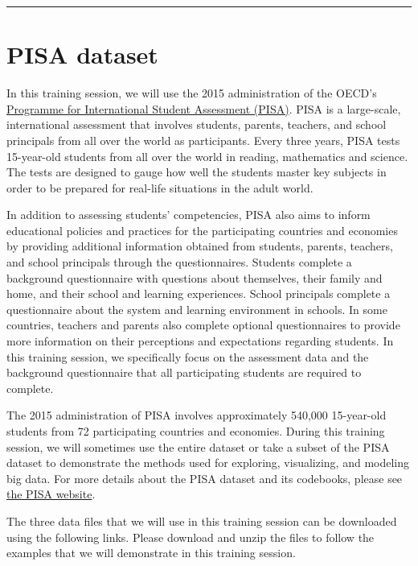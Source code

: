 \documentclass[
]{book}
\begin{document}
\begin{center}\rule{0.5\linewidth}{0.5pt}\end{center}

\hypertarget{pisa-dataset}{%
\section{PISA dataset}\label{pisa-dataset}}

In this training session, we will use the 2015 administration of the OECD's \href{http://www.oecd.org/pisa/}{Programme for International Student Assessment (PISA)}. PISA is a large-scale, international assessment that involves students, parents, teachers, and school principals from all over the world as participants. Every three years, PISA tests 15-year-old students from all over the world in reading, mathematics and science. The tests are designed to gauge how well the students master key subjects in order to be prepared for real-life situations in the adult world.

In addition to assessing students' competencies, PISA also aims to inform educational policies and practices for the participating countries and economies by providing additional information obtained from students, parents, teachers, and school principals through the questionnaires. Students complete a background questionnaire with questions about themselves, their family and home, and their school and learning experiences. School principals complete a questionnaire about the system and learning environment in schools. In some countries, teachers and parents also complete optional questionnaires to provide more information on their perceptions and expectations regarding students. In this training session, we specifically focus on the assessment data and the background questionnaire that all participating students are required to complete.

The 2015 administration of PISA involves approximately 540,000 15-year-old students from 72 participating countries and economies. During this training session, we will sometimes use the entire dataset or take a subset of the PISA dataset to demonstrate the methods used for exploring, visualizing, and modeling big data. For more details about the PISA dataset and its codebooks, please see \href{http://www.oecd.org/pisa/data/2015database/}{the PISA website}.

The three data files that we will use in this training session can be downloaded using the following links. Please download and unzip the files to follow the examples that we will demonstrate in this training session.
\end{document}
